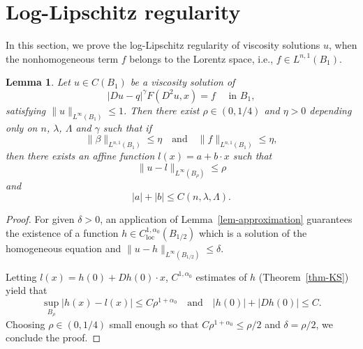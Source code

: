 \documentclass[11pt]{amsart}
\theoremstyle{plain}
\newtheorem{lemma}[theorem]{Lemma}
\theoremstyle{definition}
\numberwithin{equation}{section}
\begin{document}
\section{Log-Lipschitz regularity} \label{sec5}
In this section, we prove the log-Lipschitz regularity of viscosity solutions $u$, when the nonhomogeneous term $f$ belongs to the Lorentz space, i.e., $f \in L^{n, 1}(B_1)$.
\begin{lemma} \label{logapprolem}
    Let $u \in C(B_1)$ be a viscosity solution of 
    \begin{equation*}
            |Du-q|^\gamma F(D^2u,x) =f \quad \text{ in } B_1,
    \end{equation*}
    satisfying $\|u\|_{L^\infty(B_1)} \leq 1$.
    Then there exist $\rho \in (0, 1/4)$ and $\eta>0$ depending only on $n$, $\lambda$, $\Lambda$ and $\gamma$ such that if
    \begin{equation*}
        \|\beta\|_{L^{n, 1}(B_1)} \leq \eta \quad \text{and} \quad \|f\|_{L^{n, 1}(B_1)} \leq \eta,
    \end{equation*}
    then there exists an affine function $l(x) = a+b\cdot x$ such that 
    \begin{equation*}
        \|u-l\|_{L^\infty(B_{\rho})} \leq \rho
    \end{equation*}
    and
    \begin{equation*}
        |a|+|b| \leq C(n, \lambda, \Lambda).
    \end{equation*}
\end{lemma}

\begin{proof}
For given $\delta>0$, an application of Lemma~\ref{lem-approximation} guarantees the existence of a function $h \in C^{1,\alpha_0}_{\mathrm{loc}}(B_{1/2})$ which is a solution of the homogeneous equation and $\|u-h\|_{L^\infty(B_{1/2})} \leq \delta$.

Letting $l(x)= h(0) + Dh(0) \cdot x$, $C^{1,\alpha_0}$ estimates of $h$ (Theorem~\ref{thm-KS}) yield that
\begin{equation*}
    \sup_{B_\rho}|h(x)-l(x)| \leq C\rho^{1+\alpha_0} \quad \text{and} \quad |h(0)| + |Dh(0)| \le C.
\end{equation*}
Choosing $\rho \in (0, 1/4)$ small enough so that $C\rho^{1+\alpha_0} \leq \rho/2$ and $\delta = \rho/2$, we conclude the proof.
\end{proof}
\end{document}
